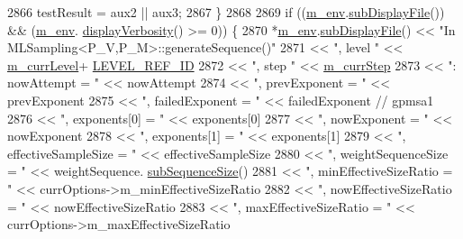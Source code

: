 \begin{DoxyCode}
2866           testResult = aux2 || aux3;
2867         \}
2868 
2869         \textcolor{keywordflow}{if} ((\hyperlink{class_q_u_e_s_o_1_1_m_l_sampling_a13f1ca4fe9f94822fe572a743eaced1d}{m\_env}.\hyperlink{class_q_u_e_s_o_1_1_base_environment_a8a0064746ae8dddfece4229b9ad374d6}{subDisplayFile}()) && (\hyperlink{class_q_u_e_s_o_1_1_m_l_sampling_a13f1ca4fe9f94822fe572a743eaced1d}{m\_env}.
      \hyperlink{class_q_u_e_s_o_1_1_base_environment_a1fe5f244fc0316a0ab3e37463f108b96}{displayVerbosity}() >= 0)) \{
2870           *\hyperlink{class_q_u_e_s_o_1_1_m_l_sampling_a13f1ca4fe9f94822fe572a743eaced1d}{m\_env}.\hyperlink{class_q_u_e_s_o_1_1_base_environment_a8a0064746ae8dddfece4229b9ad374d6}{subDisplayFile}() << \textcolor{stringliteral}{"In MLSampling<P\_V,P\_M>::generateSequence()"}
2871                                   << \textcolor{stringliteral}{", level "}                   << \hyperlink{class_q_u_e_s_o_1_1_m_l_sampling_af9416874c856e50f3b35270e801f17e4}{m\_currLevel}+
      \hyperlink{_m_l_sampling_level_options_8h_a68d15eaf394d210effcf584b938206d3}{LEVEL\_REF\_ID}
2872                                   << \textcolor{stringliteral}{", step "}                    << \hyperlink{class_q_u_e_s_o_1_1_m_l_sampling_a1b1f8ccb4823bdfa26ec652f0807c63e}{m\_currStep}
2873                                   << \textcolor{stringliteral}{": nowAttempt = "}            << nowAttempt
2874                                   << \textcolor{stringliteral}{", prevExponent = "}          << prevExponent
2875                                   << \textcolor{stringliteral}{", failedExponent = "}        << failedExponent \textcolor{comment}{// gpmsa1}
2876                                   << \textcolor{stringliteral}{", exponents[0] = "}          << exponents[0]
2877                                   << \textcolor{stringliteral}{", nowExponent = "}           << nowExponent
2878                                   << \textcolor{stringliteral}{", exponents[1] = "}          << exponents[1]
2879                                   << \textcolor{stringliteral}{", effectiveSampleSize = "}   << effectiveSampleSize
2880                                   << \textcolor{stringliteral}{", weightSequenceSize = "}    << weightSequence.
      \hyperlink{class_q_u_e_s_o_1_1_scalar_sequence_a0288ea295eedc216a1617b3286f6f3a0}{subSequenceSize}()
2881                                   << \textcolor{stringliteral}{", minEffectiveSizeRatio = "} << currOptions->m\_minEffectiveSizeRatio
2882                                   << \textcolor{stringliteral}{", nowEffectiveSizeRatio = "} << nowEffectiveSizeRatio
2883                                   << \textcolor{stringliteral}{", maxEffectiveSizeRatio = "} << currOptions->m\_maxEffectiveSizeRatio

\end{DoxyCode}
